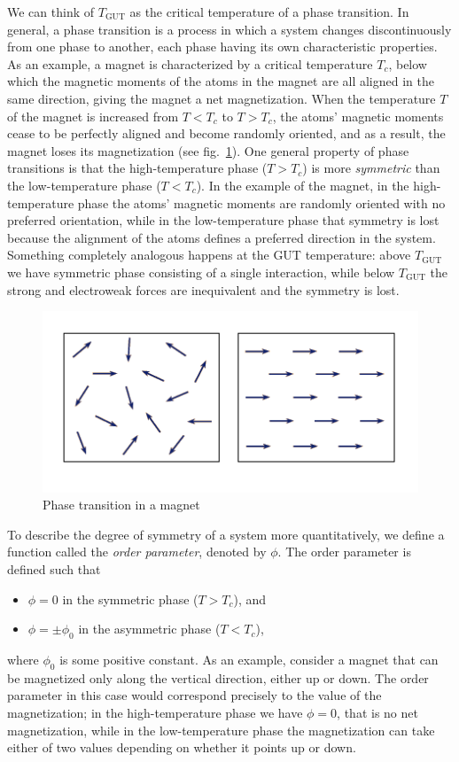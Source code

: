 \documentclass[11pt, a4paper,oneside,openright]{book}
\numberwithin{equation}{section}
\begin{document}
We can think of $T_{\mathrm{GUT}}$ as the critical temperature of a phase transition. In general, a phase transition is a process in which a system changes discontinuously from one phase to another, each phase having its own characteristic properties. As an example, a magnet is characterized by a critical temperature $T_c$, below which the magnetic moments of the atoms in the magnet are all aligned in the same direction, giving the magnet a net magnetization. When the temperature $T$ of the magnet is increased from $T<T_c$ to $T>T_c$, the atoms' magnetic moments cease to be perfectly aligned and become randomly oriented, and as a result, the magnet loses its magnetization (see fig.\ \ref{fig:lec12_6}). One general property of phase transitions is that the high-temperature phase ($T>T_c$) is more {\it symmetric} than the low-temperature phase ($T<T_c$). In the example of the magnet, in the high-temperature phase the atoms' magnetic moments are randomly oriented with no preferred orientation, while in the low-temperature phase that symmetry is lost because the alignment of the atoms defines a preferred direction in the system. Something completely analogous happens at the GUT temperature: above $T_{\mathrm{GUT}}$ we have symmetric phase consisting of a single interaction, while below $T_{\mathrm{GUT}}$ the strong and electroweak forces are inequivalent and the symmetry is lost.
\begin{figure}[ht]
\begin{center}
\includegraphics[scale=0.7]{Draw/lec12_6.png}
\end{center}
\caption{Phase transition in a magnet}
\label{fig:lec12_6}
\end{figure}

To describe the degree of symmetry of a system more quantitatively, we define a function called the {\it order parameter}, denoted by $\phi$. The order parameter is defined such that
\begin{itemize}
\item [] $\phi=0$ in the symmetric phase ($T>T_c$), and
\item [] $\phi=\pm \phi_0$ in the asymmetric phase ($T<T_c$),
\end{itemize}
where $\phi_0$ is some positive constant. As an example, consider a magnet that can be magnetized only along the vertical direction, either up or down. The order parameter in this case would correspond precisely to the value of the magnetization; in the high-temperature phase we have $\phi=0$, that is no net magnetization, while in the low-temperature phase the magnetization can take either of two values depending on whether it points up or down.
\end{document}
